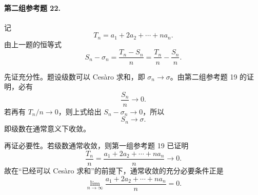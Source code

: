 \paragraph{第二组参考题 22.}
\begin{xsolution}
记
\[
 T_n=a_1+2a_2+\cdots+na_n.
\]
由上一题的恒等式
\[
 S_n-\sigma_n=\frac{T_n-S_n}{n}
 =\frac{T_n}{n}-\frac{S_n}{n}.
\]

先证充分性。题设级数可以 Cesàro 求和，即 $\sigma_n\to\sigma$。由第二组参考题 19 的证明，必有
\[
 \frac{S_n}{n}\to0.
\]
若再有 $T_n/n\to0$，则上式给出 $S_n-\sigma_n\to0$，所以
\[
 S_n\to\sigma.
\]
即级数在通常意义下收敛。

再证必要性。若级数通常收敛，则第一组参考题 19 已证明
\[
 \frac{T_n}{n}
 =\frac{a_1+2a_2+\cdots+na_n}{n}\longrightarrow0.
\]
故在“已经可以 Cesàro 求和”的前提下，通常收敛的充分必要条件正是
\[
 \boxed{\lim_{n\to\infty}\frac{a_1+2a_2+\cdots+na_n}{n}=0}.
\]
\end{xsolution}
